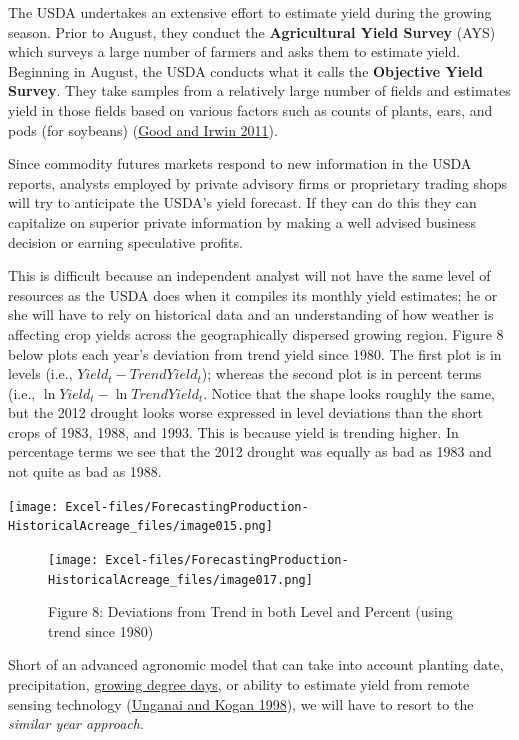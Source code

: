 \documentclass[
]{book}
\begin{document}
The USDA undertakes an extensive effort to estimate yield during the growing season. Prior to August, they conduct the \textbf{Agricultural Yield Survey} (AYS) which surveys a large number of farmers and asks them to estimate yield. Beginning in August, the USDA conducts what it calls the \textbf{Objective Yield Survey}. They take samples from a relatively large number of fields and estimates yield in those fields based on various factors such as counts of plants, ears, and pods (for soybeans) (\protect\hyperlink{ref-good2011yield}{Good and Irwin 2011}).

Since commodity futures markets respond to new information in the USDA reports, analysts employed by private advisory firms or proprietary trading shops will try to anticipate the USDA's yield forecast. If they can do this they can capitalize on superior private information by making a well advised business decision or earning speculative profits.

This is difficult because an independent analyst will not have the same level of resources as the USDA does when it compiles its monthly yield estimates; he or she will have to rely on historical data and an understanding of how weather is affecting crop yields across the geographically dispersed growing region. Figure 8 below plots each year's deviation from trend yield since 1980. The first plot is in levels (i.e., \(Yield_t - Trend Yield_t\)); whereas the second plot is in percent terms (i.e., \(\ln{Yield_t} - \ln{Trend Yield_t}\). Notice that the shape looks roughly the same, but the 2012 drought looks worse expressed in level deviations than the short crops of 1983, 1988, and 1993. This is because yield is trending higher. In percentage terms we see that the 2012 drought was equally as bad as 1983 and not quite as bad as 1988.

\texttt{[image: Excel-files/ForecastingProduction-HistoricalAcreage\_files/image015.png]}

\begin{figure}
\centering
\texttt{[image: Excel-files/ForecastingProduction-HistoricalAcreage\_files/image017.png]}
\caption{Figure 8: Deviations from Trend in both Level and Percent (using trend since 1980)}
\end{figure}

Short of an advanced agronomic model that can take into account planting date, precipitation, \href{https://en.wikipedia.org/wiki/Growing_degree-day}{growing degree days}, or ability to estimate yield from remote sensing technology (\protect\hyperlink{ref-unganai1998drought}{Unganai and Kogan 1998}), we will have to resort to the \emph{similar year approach}.
\end{document}

